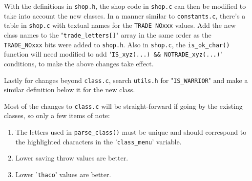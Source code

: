 \documentclass[11pt]{article}
\begin{document}
\par
With the definitions in \texttt{shop.h}, the shop code in \texttt{shop.c} can then be modified to take into account the new classes. In a manner similar to \texttt{constants.c}, there's a table in \texttt{shop.c} with textual names for the \texttt{TRADE\_NOxxx} values.  Add the new class names to the "\texttt{trade\_letters[]}" array in the same order as the \texttt{TRADE\_NOxxx} bits were added to \texttt{shop.h}.  Also in \texttt{shop.c}, the \texttt{is\_ok\_char()} function will need modified to add "\texttt{IS\_xyz(...) \&\& NOTRADE\_xyz(...)}" conditions, to make the above changes take effect.
\par
Lastly for changes beyond \texttt{class.c}, search \texttt{utils.h} for "\texttt{IS\_WARRIOR}" and
make a similar definition below it for the new class.
\par
Most of the changes to \texttt{class.c} will be straight-forward if going by the existing classes, so only a few items of note:
\begin{enumerate}
\item The letters used in \texttt{parse\_class()} must be unique and should correspond to the highlighted characters in the '\texttt{class\_menu}' variable.
\item Lower saving throw values are better.
\item Lower '\texttt{thaco}' values are better.
\end{enumerate}
\end{document}
